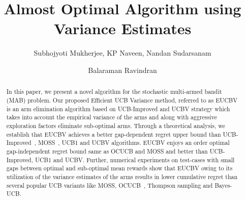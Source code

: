 \documentclass{llncs}
\begin{document}
%
\frontmatter          %
%
\pagestyle{headings}  %

\mainmatter              %
%
\title{Almost Optimal Algorithm using Variance Estimates}
%
%
\author{Subhojyoti Mukherjee, KP Naveen, Nandan Sudarsanam
 \and Balaraman Ravindran}
%
%
%

\maketitle              %

\begin{abstract}
In this paper, we present a novel algorithm for the stochastic multi-armed bandit (MAB) problem. Our proposed Efficient UCB Variance method, referred to as EUCBV is an arm elimination algorithm based on  UCB-Improved and UCBV strategy which takes into account the empirical variance of the arms and along  with aggressive exploration factors eliminate sub-optimal arms. Through a theoretical analysis, we establish that EUCBV achieves a better gap-dependent regret upper bound than UCB-Improved~\cite{auer2010ucb}, MOSS~\cite{audibert2009minimax}, UCB1 and UCBV algorithms. EUCBV enjoys an order optimal gap-independent regret bound same as OCUCB and MOSS and better than UCB-Improved, UCB1 and UCBV. Further, numerical experiments on test-cases with small gaps between optimal and sub-optimal mean rewards show that EUCBV owing to its utilization of the variance estimates of the arms results in lower cumulative regret than several popular UCB variants like MOSS, OCUCB~\cite{lattimore2015optimally}, Thompson sampling and Bayes-UCB\cite{kaufmann2012bayesian}. 

\end{abstract}
\end{document}

